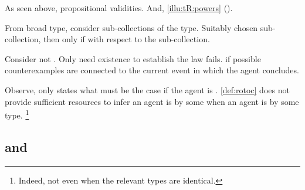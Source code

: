 \begin{note}
  As seen above, propositional validities.
  And, \autoref{illu:tR:powers} ().

  From broad type, consider sub-collections of the type.
  Suitably chosen sub-collection, then \tCV{} only if \ptCV{} with respect to the sub-collection.

  Consider not \tCV{}.
  Only need existence to establish the law fails.
  \rotoc{} if possible counterexamples are connected to the current event in which the agent concludes.
\end{note}

\begin{note}
  Observe, \rotoc{} only states what must be the case if the agent is \tCV{}.
  \autoref{def:rotoc} does not provide sufficient resources to infer an agent is \tCV{} by some \torN{} when an agent is \ptCV{} by some type.%
  \footnote{
    Indeed, not even when the relevant types are identical.
  }
\end{note}

\subsection{ and }
\label{cha:typical:tCDef:tRDef}

